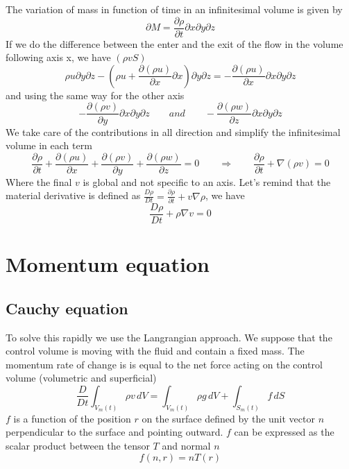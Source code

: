 			The variation of mass in function of time in an infinitesimal volume is given by 
			\begin{equation}
				\partial M = \frac{\partial \rho}{\partial t} \partial x \partial y \partial z
			\end{equation}
			If we do the difference between the enter and the exit of the flow in the volume following axis x, we have $(\rho v S)$
			\begin{equation}
				\rho u \partial y \partial z - \left( \rho u + \frac{\partial (\rho u)}{\partial x}\partial x \right) \partial y \partial z
				= - \frac{\partial (\rho u)}{\partial x}\partial x \partial y \partial z
			\end{equation}
			and using the same way for the other axis
			\begin{equation}
				- \frac{\partial (\rho v)}{\partial y}\partial x \partial y \partial z
				 \qquad and \qquad 
				- \frac{\partial (\rho w)}{\partial z}\partial x \partial y \partial z
			\end{equation}
			We take care of the contributions in all direction and simplify the infinitesimal volume in each term
			\begin{equation}
				\frac{\partial \rho}{\partial t} + \frac{\partial (\rho u)}{\partial x} + \frac{\partial (\rho v)}{\partial y} + \frac{\partial (\rho w)}{\partial z} = 0 
				\qquad \Rightarrow \qquad
				\frac{\partial \rho}{\partial t} + \nabla (\rho v) = 0
			\end{equation}
			Where the final $v$ is global and not specific to an axis. Let's remind that the material derivative is defined as $\frac{D\rho}{Dt} = \frac{\partial \rho}{\partial t} + v \nabla \rho$, we have
			\begin{equation}
				\frac{D\rho}{Dt} + \rho \nabla v = 0
			\end{equation}
			
\section{Momentum equation}
\subsection{Cauchy equation}
	To solve this rapidly we use the Langrangian approach. We suppose that the control volume is moving with the fluid and contain a fixed mass. The momentum rate of change is is equal to the net force acting on the control volume (volumetric and superficial)
	\begin{equation}
		\frac{D}{Dt} \int _{V_m(t)} \rho v \, dV = \int _{V_m(t)} \rho g \, dV + \int _{S_m(t)} f \, dS
		\label{eq:2.18}
	\end{equation}
	$f$ is a function of the position $r$ on the surface defined by the unit vector $n$ perpendicular to the surface and pointing outward. $f$ can be expressed as the scalar product between the tensor $T$ and normal $n$
	\begin{equation}
		f(n,r) = nT(r)
		\label{eq:2.19}
	\end{equation}
	
